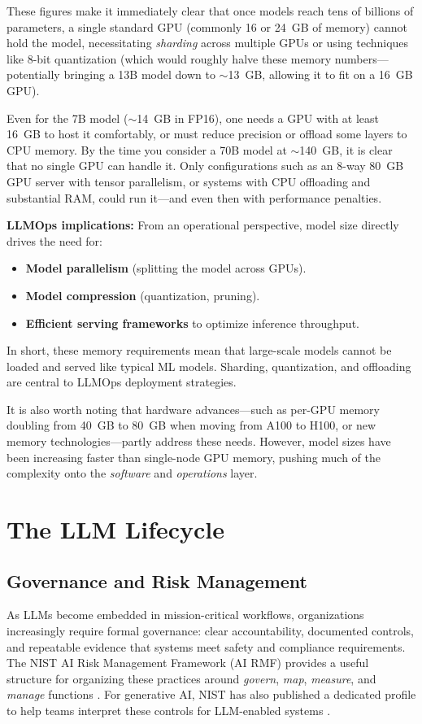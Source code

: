 These figures make it immediately clear that once models reach tens of billions of parameters, a single standard GPU (commonly 16 or 24~GB of memory) cannot hold the model, necessitating \emph{sharding} across multiple GPUs or using techniques like 8-bit quantization (which would roughly halve these memory numbers—potentially bringing a 13B model down to $\sim$13~GB, allowing it to fit on a 16~GB GPU).  

Even for the 7B model ($\sim$14~GB in FP16), one needs a GPU with at least 16~GB to host it comfortably, or must reduce precision or offload some layers to CPU memory. By the time you consider a 70B model at $\sim$140~GB, it is clear that no single GPU can handle it. Only configurations such as an 8-way 80~GB GPU server with tensor parallelism, or systems with CPU offloading and substantial RAM, could run it—and even then with performance penalties.  

\noindent\textbf{LLMOps implications:}  
From an operational perspective, model size directly drives the need for:
\begin{itemize}
    \item \textbf{Model parallelism} (splitting the model across GPUs).
    \item \textbf{Model compression} (quantization, pruning).
    \item \textbf{Efficient serving frameworks} to optimize inference throughput.
\end{itemize}

In short, these memory requirements mean that large-scale models cannot be loaded and served like typical ML models. Sharding, quantization, and offloading are central to LLMOps deployment strategies.  

It is also worth noting that hardware advances—such as per-GPU memory doubling from 40~GB to 80~GB when moving from A100 to H100, or new memory technologies—partly address these needs. However, model sizes have been increasing faster than single-node GPU memory, pushing much of the complexity onto the \emph{software} and \emph{operations} layer.


\section{The LLM Lifecycle}
\label{sec:ch2-lifecycle}

\subsection{Governance and Risk Management}
\label{sec:ch2-governance}
As LLMs become embedded in mission-critical workflows, organizations increasingly require formal governance:
clear accountability, documented controls, and repeatable evidence that systems meet safety and compliance requirements.
The NIST AI Risk Management Framework (AI RMF) provides a useful structure for organizing these practices around
\emph{govern}, \emph{map}, \emph{measure}, and \emph{manage} functions \cite{nist_ai_rmf}. For generative AI, NIST has also published
a dedicated profile to help teams interpret these controls for LLM-enabled systems \cite{nist_genai_profile}.

